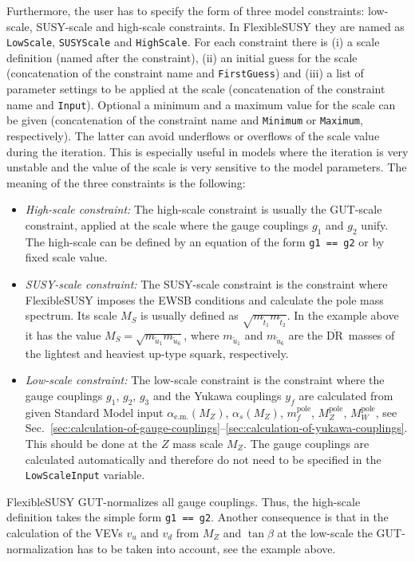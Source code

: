 \documentclass[final,3p,11pt,pdflatex]{elsarticle}
\newcommand{\fs}{FlexibleSUSY\xspace}
\newcommand{\code}[1]{\lstinline|#1|}  %
\newcommand{\textoverline}[1]{$\overline{\mbox{#1}}$}
\newcommand{\DRbar}{\textoverline{DR}\xspace}
\newcommand{\pole}{\text{pole}}
\begin{document}
Furthermore, the user has to specify the form of three model
constraints: low-scale, SUSY-scale and high-scale constraints.  In \fs
they are named as \code{LowScale}, \code{SUSYScale} and
\code{HighScale}.  For each constraint there is (i) a scale definition
(named after the constraint), (ii) an initial guess for the scale
(concatenation of the constraint name and \code{FirstGuess}) and (iii)
a list of parameter settings to be applied at the scale (concatenation
of the constraint name and \code{Input}).  Optional a minimum and a
maximum value for the scale can be given (concatenation of the
constraint name and \code{Minimum} or \code{Maximum}, respectively).
The latter can avoid underflows or overflows of the scale value during
the iteration.  This is especially useful in models where the
iteration is very unstable and the value of the scale is very
sensitive to the model parameters.  The meaning of the three
constraints is the following:
%
\begin{itemize}
\item \emph{High-scale constraint:} The high-scale constraint is
  usually the GUT-scale constraint, applied at the scale where the
  gauge couplings $g_1$ and $g_2$ unify.  The high-scale can be
  defined by an equation of the form \code{g1 == g2} or by fixed scale
  value.
%
\item \emph{SUSY-scale constraint:} The SUSY-scale constraint is the
  constraint where \fs imposes the EWSB conditions and calculate the
  pole mass spectrum.  Its scale $M_S$ is usually defined as
  $\sqrt{m_{\tilde{t}_1}m_{\tilde{t}_2}}$.  In the example above it
  has the value $M_S = \sqrt{m_{\tilde{u}_1}m_{\tilde{u}_6}}$, where
  $m_{\tilde{u}_1}$ and $m_{\tilde{u}_6}$ are the \DRbar\ masses of
  the lightest and heaviest up-type squark, respectively.
%
\item \emph{Low-scale constraint:} The low-scale constraint is the
  constraint where the gauge couplings $g_1$, $g_2$, $g_3$ and the
  Yukawa couplings $y_f$ are calculated from given Standard Model
  input $\alpha_{\text{e.m.}}(M_Z)$, $\alpha_{s}(M_Z)$, $m_f^\pole$,
  $M_Z^\pole$, $M_W^\pole$, see
  Sec.~\ref{sec:calculation-of-gauge-couplings}--\ref{sec:calculation-of-yukawa-couplings}.
  This should be done at the $Z$ mass scale $M_Z$.  The gauge
  couplings are calculated automatically and therefore do not need to
  be specified in the \code{LowScaleInput} variable.
\end{itemize}
%
\fs GUT-normalizes all gauge couplings.  Thus, the high-scale
definition takes the simple form \code{g1 == g2}.  Another consequence
is that in the calculation of the VEVs $v_u$ and $v_d$ from $M_Z$ and
$\tan\beta$ at the low-scale the GUT-normalization has to be taken
into account, see the example above.
\end{document}
